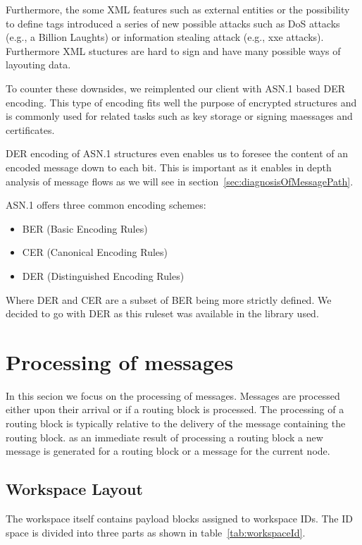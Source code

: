 Furthermore, the some XML features such as external entities or the possibility to define tags introduced a series of new possible attacks such as DoS attacks (e.g., a Billion Laughts) or information stealing attack (e.g., xxe attacks). Furthermore XML stuctures are hard to sign and have many possible ways of layouting data. 

To counter these downsides, we reimplented our client with ASN.1 based DER encoding. This type of encoding fits well the purpose of encrypted structures and is commonly used for related tasks such as key storage or signing maessages and certificates.

DER encoding of ASN.1 structures even enables us to foresee the content of an encoded message down to each bit. This is important as it enables in depth analysis of message flows as we will see in section~\ref{sec:diagnosisOfMessagePath}.

ASN.1 offers three common encoding schemes:
\begin{itemize}
	\item BER (Basic Encoding Rules)
	\item CER (Canonical Encoding Rules)
	\item DER (Distinguished Encoding Rules)
\end{itemize}

Where DER and CER are a subset of BER being more strictly defined. We decided to go with DER as this ruleset was available in the library used.

\section{Processing of messages\label{sec:messageProcessing}}
In this secion we focus on the processing of messages. Messages are processed either upon their arrival or if a routing block is processed. The processing of a routing block is typically relative to the delivery of the message containing the routing block. as an immediate result of processing a routing block a new message is generated for a routing block or a message for the current node.

\subsection{Workspace Layout}
The workspace itself contains payload blocks assigned to workspace IDs. The ID space is divided into three parts as shown in table~\ref{tab:workspaceId}.

